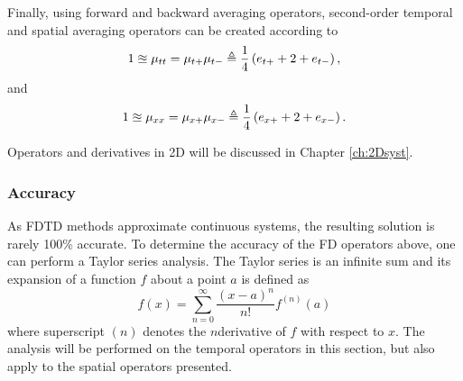 Finally, using forward and backward averaging operators, second-order temporal and spatial averaging operators can be created according to
\begin{equation}
    1 \approxeq \mu_{tt} = \mu_{t+}\mu_{t-} \triangleq \frac{1}{4}\left(e_{t+}+2+e_{t-}\right),
\end{equation}
and
\begin{equation}
    1 \approxeq \mu_{xx} = \mu_{x+}\mu_{x-} \triangleq \frac{1}{4}\left(e_{x+}+2+e_{x-}\right).
\end{equation}

Operators and derivatives in 2D will be discussed in Chapter \ref{ch:2Dsyst}.


\subsubsection{Accuracy}
As FDTD methods approximate continuous systems, the resulting solution is rarely 100\% accurate. To determine the accuracy of the FD operators above, one can perform a Taylor series analysis. The Taylor series is an infinite sum and its expansion of a function $f$ about a point $a$ is defined as
\begin{equation}
    f(x) = \sum_{n=0}^{\infty} \frac{(x-a)^n}{n!}f^{(n)}(a)
\end{equation}
where superscript $(n)$ denotes the $n$\th derivative of $f$ with respect to $x$. The analysis will be performed on the temporal operators in this section, but also apply to the spatial operators presented.

